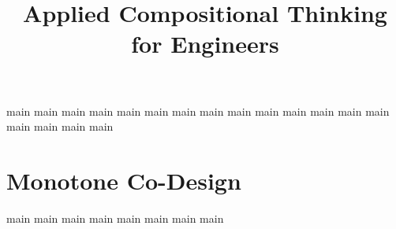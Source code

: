 

\pagestyle{scrheadings}%

 \ohead{\pagemark}
 \ihead{\headmark}
 \cfoot{}
\dominitoc
\doparttoc
\setcounter{parttocdepth}{0}
\setcounter{minitocdepth}{1}

\title{Applied Compositional Thinking\\ for Engineers}
\date{}



\setcounter{tocdepth}{1}
\tableofcontents


{main}
{main}
{main}
{main}
{main}
{main}
{main}
{main}
{main}
{main}
{main}
{main}
{main}
{main}
{main}
{main}
{main}
{main}



\part{Monotone Co-Design}\label{part:co-design}

{main}
{main}
{main}
{main}
{main}
{main}
{main}
{main}




